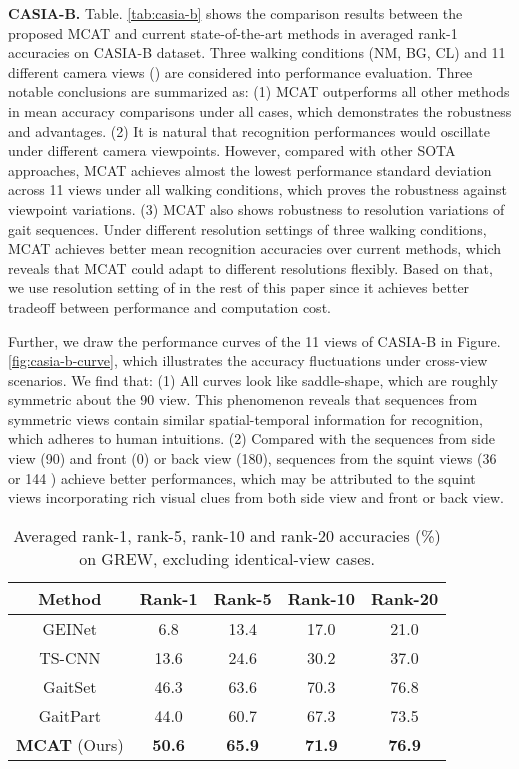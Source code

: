 \documentclass[journal]{IEEEtran}
\begin{document}
\noindent \textbf{CASIA-B.} Table. \ref{tab:casia-b} shows the comparison results between the proposed MCAT and current state-of-the-art methods in averaged rank-1 accuracies on CASIA-B dataset. Three walking conditions (NM, BG, CL) and 11 different camera views () are considered into performance evaluation. Three notable conclusions are summarized as: (1) MCAT outperforms all other methods in mean accuracy comparisons under all cases, which demonstrates the robustness and advantages. (2) It is natural that recognition performances would oscillate under different camera viewpoints. However, compared with other SOTA approaches, MCAT achieves almost the lowest performance standard deviation across 11 views under all walking conditions, which proves the robustness against viewpoint variations. (3) MCAT also shows robustness to resolution variations of gait sequences. Under different resolution settings of three walking conditions, MCAT achieves better mean recognition accuracies over current methods, which reveals that MCAT could adapt to different resolutions flexibly. Based on that, we use resolution setting of  in the rest of this paper since it achieves better tradeoff between performance and computation cost.

Further, we draw the performance curves of the 11 views of CASIA-B in Figure. \ref{fig:casia-b-curve}, which illustrates the accuracy fluctuations under cross-view scenarios. We find that: (1) All curves look like saddle-shape, which are roughly symmetric about the 90 view. This phenomenon reveals that sequences from symmetric views contain similar spatial-temporal information for recognition, which adheres to human intuitions. (2) Compared with the sequences from side view (90) and front (0) or back view (180), sequences from the squint views (36  or 144 ) achieve better performances, which may be attributed to the squint views incorporating rich visual clues from both side view and front or back view.

\begin{table}[t]
    \centering
    \caption{Averaged rank-1, rank-5, rank-10 and rank-20 accuracies (\%) on GREW, excluding identical-view cases.}
    \begin{tabular}{|c|c|c|c|c|}
        \hline
        Method & Rank-1 & Rank-5 & Rank-10 & Rank-20 \\\hline
        GEINet \cite{geinet} & 6.8 & 13.4 & 17.0 & 21.0 \\
        TS-CNN \cite{wu2016comprehensive} & 13.6 & 24.6 & 30.2 & 37.0 \\
        GaitSet \cite{chao2021gaitset} & 46.3 & 63.6 & 70.3 & 76.8 \\
        GaitPart \cite{fan2020gaitpart} & 44.0 & 60.7 & 67.3 & 73.5 \\
        \textbf{MCAT} (Ours) & \textbf{50.6} & \textbf{65.9} & \textbf{71.9} & \textbf{76.9} \\\hline
    \end{tabular}
    \label{tab:grew}
\end{table}
\end{document}
